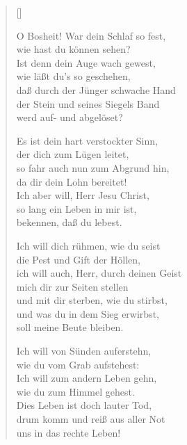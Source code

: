 \begin{multicols}{2}
\begin{verse}[\versewidth]
\vfill\null
\columnbreak


 O Bosheit! War dein Schlaf so fest,\\
wie hast du können sehen?\\
Ist denn dein Auge wach gewest,\\
wie läßt du's so geschehen,\\
daß durch der Jünger schwache Hand\\
der Stein und seines Siegels Band\\
werd auf- und abgelöset?

 Es ist dein hart verstockter Sinn,\\
der dich zum Lügen leitet,\\
so fahr auch nun zum Abgrund hin,\\
da dir dein Lohn bereitet!\\
Ich aber will, Herr Jesu Christ,\\
so lang ein Leben in mir ist,\\
bekennen, daß du lebest.

 Ich will dich rühmen, wie du seist\\
die Pest und Gift der Höllen,\\
ich will auch, Herr, durch deinen Geist\\
mich dir zur Seiten stellen\\
und mit dir sterben, wie du stirbst,\\
und was du in dem Sieg erwirbst,\\
soll meine Beute bleiben.

 Ich will von Sünden auferstehn,\\
wie du vom Grab aufstehest:\\
Ich will zum andern Leben gehn,\\
wie du zum Himmel gehest.\\
Dies Leben ist doch lauter Tod,\\
drum komm und reiß aus aller Not\\
uns in das rechte Leben!

\end{verse}
\end{multicols}
